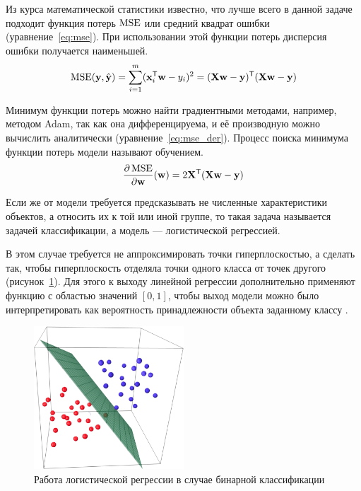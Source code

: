 Из курса математической статистики известно, что лучше всего в данной задаче подходит функция потерь $\operatorname{MSE}$ или средний квадрат ошибки (уравнение \ref*{eq:mse}). При использовании этой функции потерь дисперсия ошибки получается наименьшей.
\begin{equation}
    \label{eq:mse}
    \operatorname{MSE}(\mathbf{y},\hat{\mathbf{y}})=\sum\limits_{i=1}^m(\mathbf{x}_i^\mathsf{T}\mathbf{w}-y_i)^2=(\mathbf{X}\mathbf{w}-\mathbf{y})^\mathsf{T}(\mathbf{X}\mathbf{w}-\mathbf{y})
\end{equation}

Минимум функции потерь можно найти градиентными методами, например, методом Adam, так как она дифференцируема, и её производную можно вычислить аналитически (уравнение \ref*{eq:mse_der}). Процесс поиска минимума функции потерь модели называют обучением.
\begin{equation}
    \label{eq:mse_der}
    \frac{\partial\operatorname{MSE}}{\partial \mathbf{w}}(\mathbf{w})=2\mathbf{X}^\mathsf{T}(\mathbf{X}\mathbf{w}-\mathbf{y})
\end{equation}

Если же от модели требуется предсказывать не численные характеристики объектов, а относить их к той или иной группе, то такая задача называется задачей классификации, а модель --- логистической регрессией.

В этом случае требуется не аппроксимировать точки гиперплоскостью, а сделать так, чтобы гиперплоскость отделяла точки одного класса от точек другого (рисунок \ref*{fig:log_reg}). Для этого к выходу линейной регрессии дополнительно применяют функцию с областью значений $[0, 1]$, чтобы выход модели можно было интерпретировать как вероятность принадлежности объекта заданному классу \cite{art:linear_models}.
\begin{figure}[h]
    \centering
    \includegraphics[width=0.5\textwidth]{../inc/images/logistic_regression.png}
    \caption{Работа логистической регрессии в случае бинарной классификации}
    \label{fig:log_reg}
\end{figure}

